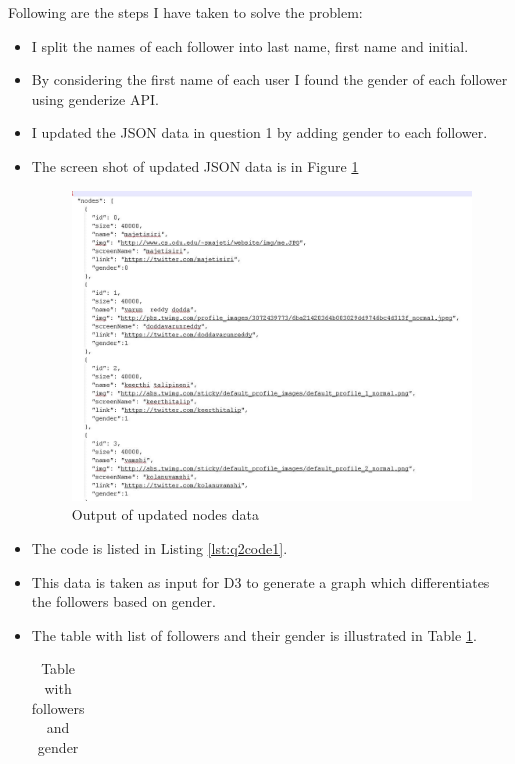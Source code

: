 Following are the steps I have taken to solve the problem:
\begin{itemize}
\item I split the names of each follower into last name, first name and initial. 
\item By considering the first name of each user I found the gender of each follower using genderize API.
\item I updated the JSON data in question 1 by adding gender to each follower.
\newpage
\item The screen shot of updated JSON data is in Figure \ref{fig:q1fig1}
\begin{figure}[h!]
\begin{center}
\includegraphics[scale=0.55, keepaspectratio=true]{figures/6.JPG}
\caption{Output of updated nodes data}
\label{fig:q1fig1}
\end{center}
\end{figure}
\item The code is listed in Listing \ref{lst:q2code1}.
\newpage
\item This data is taken as input for D3 to generate a graph which differentiates the followers based on gender. 
\item The table with list of followers and their gender is illustrated in Table \ref{Table:q1table1}. 
\begin{table}

\caption{Table with followers and gender}
\label{Table:q1table1}
\begin{center}
\begin{tabular}{| c | c |}
\hline


\end{tabular}
\end{center}
\end{table}
\end{itemize}
